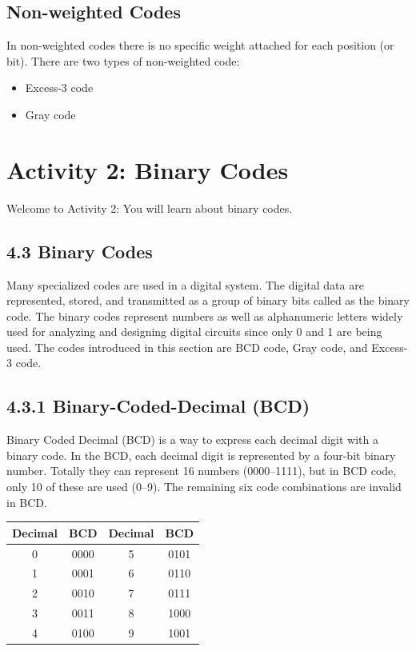 \documentclass[12pt,a4paper]{article}
\begin{document}
\subsection*{Non-weighted Codes}
In non-weighted codes there is no specific weight attached for each position (or bit). There are two types of non-weighted code:
\begin{itemize}
    \item Excess-3 code
    \item Gray code
\end{itemize}

\section*{Activity 2: Binary Codes}
Welcome to Activity 2: You will learn about binary codes.

\subsection*{4.3 Binary Codes}
Many specialized codes are used in a digital system. The digital data are represented, stored, and transmitted as a group of binary bits called as the binary code. The binary codes represent numbers as well as alphanumeric letters widely used for analyzing and designing digital circuits since only 0 and 1 are being used. The codes introduced in this section are BCD code, Gray code, and Excess-3 code.

\subsection*{4.3.1 Binary-Coded-Decimal (BCD)}
Binary Coded Decimal (BCD) is a way to express each decimal digit with a binary code. In the BCD, each decimal digit is represented by a four-bit binary number. Totally they can represent 16 numbers (0000--1111), but in BCD code, only 10 of these are used (0--9). The remaining six code combinations are invalid in BCD.

\begin{table}[h!]
    \centering
    \begin{tabular}{|c|c|c|c|}
        \hline
        \textbf{Decimal} & \textbf{BCD} & \textbf{Decimal} & \textbf{BCD} \\ \hline
        0 & 0000 & 5 & 0101 \\ \hline
        1 & 0001 & 6 & 0110 \\ \hline
        2 & 0010 & 7 & 0111 \\ \hline
        3 & 0011 & 8 & 1000 \\ \hline
        4 & 0100 & 9 & 1001 \\ \hline
    \end{tabular}
\end{table}
\end{document}
